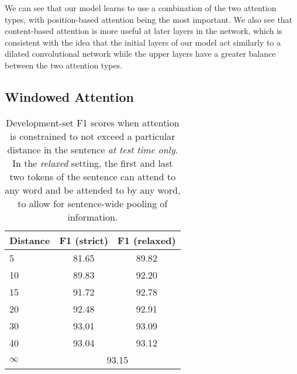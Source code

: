 \documentclass[11pt,a4paper]{article}
\begin{document}
We can see that our model learns to use a combination of the two attention types, with position-based attention being the most important. We also see that content-based attention is more useful at later layers in the network, which is consistent with the idea that the initial layers of our model act similarly to a dilated convolutional network while the upper layers have a greater balance between the two attention types.

\subsection{Windowed Attention}

\begin{table}[t!]
\begin{center}
\begin{tabular}{@{}lcc@{}}
\toprule
Distance & \phantom{a}F1 (strict)\phantom{a} & F1 (relaxed) \\
\midrule
5  & 81.65 & 89.82 \\
10 & 89.83 & 92.20 \\
15 & 91.72 & 92.78 \\
20 & 92.48 & 92.91 \\
30 & 93.01 & 93.09 \\
40 & 93.04 & 93.12 \\
$\infty$ & \multicolumn{2}{c}{93.15} \\
\bottomrule
\end{tabular}
\end{center}
\caption{
\label{table:distance-pretrained}
Development-set F1 scores when attention is constrained to not exceed a particular distance in the sentence \emph{at test time only}. In the \emph{relaxed} setting, the first and last two tokens of the sentence can attend to any word and be attended to by any word, to allow for sentence-wide pooling of information.
}
\end{table}
\end{document}
